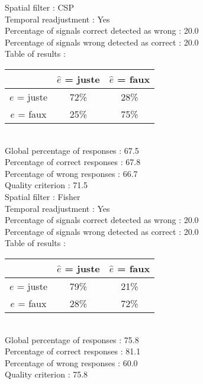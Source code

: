 Spatial filter : CSP \\
Temporal readjustment : Yes \\
Percentage of signals correct detected as wrong :   20.0 \\
Percentage of signals wrong detected as correct :   20.0 \\
Table of results : \\
\begin{tabular}{|c|c|c|}
\hline				& $\hat{e}$ = juste & $\hat{e}$ = faux \\
\hline  $e$ = juste	&     72\%			&     28\%		\\
\hline  $e$ = faux	&     25\%			&     75\%		\\
\hline
\end{tabular}\\
Global percentage of responses :   67.5 \\
Percentage of correct responses :   67.8 \\
Percentage of wrong responses :   66.7 \\
Quality criterion :   71.5 \\

Spatial filter : Fisher \\
Temporal readjustment : Yes \\
Percentage of signals correct detected as wrong :   20.0 \\
Percentage of signals wrong detected as correct :   20.0 \\
Table of results : \\
\begin{tabular}{|c|c|c|}
\hline				& $\hat{e}$ = juste & $\hat{e}$ = faux \\
\hline  $e$ = juste	&     79\%			&     21\%		\\
\hline  $e$ = faux	&     28\%			&     72\%		\\
\hline
\end{tabular}\\
Global percentage of responses :   75.8 \\
Percentage of correct responses :   81.1 \\
Percentage of wrong responses :   60.0 \\
Quality criterion :   75.8 \\

